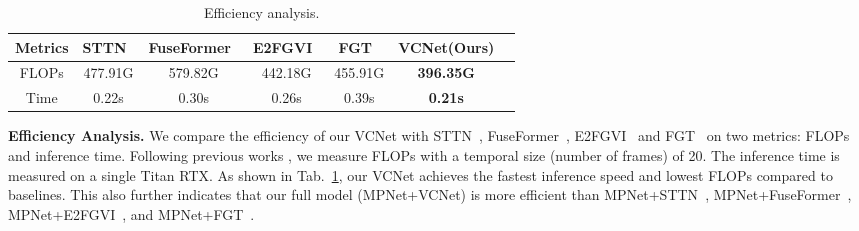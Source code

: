 \begin{table}[!t]
\footnotesize
\renewcommand\tabcolsep{0.5pt}
  \centering
  \caption{Efficiency analysis.}
  \vspace{-0.2cm}
    \begin{tabular}{c||cccccc}
    \hline
    \hline 
    \rowcolor{mygray} {Metrics}  & STTN~\cite{yan2020sttn}  &FuseFormer~\cite{liu2021fuseformer}   & E2FGVI~\cite{li2022towards}  &FGT~\cite{zhang2022flow} & VCNet(Ours)\\
    \hline
    \hline
    FLOPs &477.91G &579.82G   &442.18G   & 455.91G  &\textbf{396.35G} \\
    Time  &0.22s   &0.30s     &0.26s &0.39s   &\textbf{0.21s}\\
    \hline
    \hline
    \end{tabular}%
    \vspace{-0.3cm}
  \label{AS_ETC}%
\end{table}%


\noindent\textbf{Efficiency Analysis.}
We compare the efficiency of our VCNet with STTN~\cite{yan2020sttn}, FuseFormer~\cite{liu2021fuseformer}, E2FGVI~\cite{li2022towards} and FGT~\cite{zhang2022flow} on two metrics: FLOPs and inference time. 
Following previous works \cite{liu2021fuseformer,yan2020sttn,zhang2022flow}, we measure FLOPs with a temporal size (number of frames) of 20.
The inference time is measured on a single Titan RTX. 
As shown in Tab.~\ref{AS_ETC}, our VCNet achieves the fastest inference speed and lowest FLOPs compared to baselines. 
This also further indicates that our full model (MPNet+VCNet) is more efficient than MPNet+STTN~\cite{yan2020sttn}, MPNet+FuseFormer~\cite{liu2021fuseformer}, MPNet+E2FGVI~\cite{li2022towards}, and MPNet+FGT~\cite{zhang2022flow}. 


